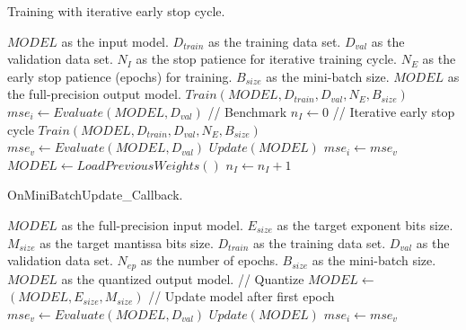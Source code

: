 \begin{algorithm}[h!]
	\caption{Training with iterative early stop cycle.}
	\label{alg:training}
	\begin{algorithmic}
		\SetAlgoLined
		\renewcommand{\algorithmicrequire}{\textbf{input:}}
		\renewcommand{\algorithmicensure}{\textbf{output:}}
		\REQUIRE $MODEL$ as the input model.
		\REQUIRE $D_{train}$ as the training data set.
		\REQUIRE $D_{val}$ as the validation data set.
		\REQUIRE $N_{I}$ as the stop patience for iterative training cycle.
		\REQUIRE $N_{E}$ as the early stop patience (epochs) for training.
		\REQUIRE $B_{size}$ as the mini-batch size.
		\ENSURE $MODEL$ as the full-precision output model.
		\STATE $Train(MODEL, D_{train}, D_{val}, N_{E}, B_{size})$
		\STATE $mse_i \gets Evaluate(MODEL, D_{val})$ // Benchmark
		\STATE $n_I \gets 0$
		\STATE // Iterative early stop cycle
		\STATE $Train(MODEL, D_{train}, D_{val}, N_{E}, B_{size})$
		\STATE $mse_v \gets Evaluate(MODEL, D_{val})$
			\STATE $Update(MODEL)$
			\STATE $mse_i \gets mse_v$
		\ELSE
			\STATE $MODEL  \gets LoadPreviousWeights()$
			\STATE $n_I \gets n_I + 1$
		\ENDIF
		\ENDWHILE
	\end{algorithmic}
\end{algorithm}


\begin{algorithm}[h!]
	\caption{OnMiniBatchUpdate\_Callback.}
	\label{alg:quantization_integration}
	\begin{algorithmic}
		\SetAlgoLined
		\renewcommand{\algorithmicrequire}{\textbf{input:}}
		\renewcommand{\algorithmicensure}{\textbf{output:}}
		\REQUIRE $MODEL$ as the full-precision input model.
		\REQUIRE $E_{size}$ as the target exponent bits size.
		\REQUIRE $M_{size}$ as the target mantissa bits size.
		\REQUIRE $D_{train}$ as the training data set.
		\REQUIRE $D_{val}$ as the validation data set.
		\REQUIRE $N_{ep}$ as the number of epochs.
		\REQUIRE $B_{size}$ as the mini-batch size.
		\ENSURE $MODEL$ as the quantized output model.
		\STATE // Quantize
		\STATE $MODEL \gets$ $(MODEL,E_{size}, M_{size})$ 
		\IF {$1<epoch$}
		\STATE // Update model after first epoch
		\STATE $mse_v \gets Evaluate(MODEL, D_{val})$
		\IF{$mse_v < mse_i$}
		\STATE $Update(MODEL)$
		\STATE $mse_i \gets mse_v$
		\ENDIF
		\ENDIF
	\end{algorithmic}
\end{algorithm}

